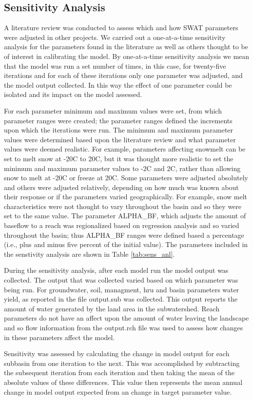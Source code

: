 \subsection{Sensitivity Analysis}
	A literature review was conducted to assess which and how SWAT parameters were adjusted in other projects. We carried out a one-at-a-time sensitivity analysis for the parameters found in the literature as well as others thought to be of interest in calibrating the model. By one-at-a-time sensitivity analysis we mean that the model was run a set number of times, in this case, for twenty-five iterations and for each of these iterations only one parameter was adjusted, and the model output collected. In this way the effect of one parameter could be isolated and its impact on the model assessed. 

	For each parameter minimum and maximum values were set, from which parameter ranges were created; the parameter ranges defined the increments upon which the iterations were run. The minimum and maximum parameter values were determined based upon the literature review and what parameter values were deemed realistic. For example, parameters affecting snowmelt can be set to melt snow at -20\degree C  to 20\degree C, but it was thought more realistic to set the minimum and maximum parameter values to -2\degree C  and 2\degree C, rather than allowing snow to melt at -20\degree C  or freeze at 20\degree C. Some parameters were adjusted absolutely and others were adjusted relatively, depending on how much was known about their response or if the parameters varied geographically. For example, snow melt characteristics were not thought to vary throughout the basin and so they were set to the same value. The parameter ALPHA\_BF, which adjusts the amount of baseflow to a reach was regionalized based on regression analysis and so varied throughout the basin; thus ALPHA\_BF ranges were defined based a percentage (i.e., plus and minus five percent of the initial value). The parameters included in the senstivity analysis are shown in Table \ref{tab:sens_anl}. 

	During the sensitivity analysis, after each model run the model output was collected. The output that was collected varied based on which parameter was being run. For groundwater, soil, managment, hru and basin parameters water yield, as reported in the file output.sub was collected. This output reports the amount of water generated by the land area in the subwatershed. Reach parameters do not have an affect upon the amount of water leaving the landscape and so flow information from the output.rch file was used to assess how changes in these parameters affect the model.
	
	Sensitivity was assessed by calculating the change in model output for each subbasin from one iteration to the next. This was accomplished by subtracting the subsequent iteration from each iteration and then taking the mean of the absolute values of these differences. This value then represents the mean annual change in model output expected from an change in target parameter value. 


\pagebreak